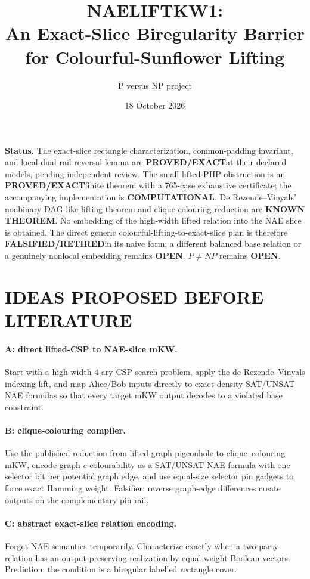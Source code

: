 \documentclass[11pt]{article}
\title{NAELIFTKW1:\\An Exact-Slice Biregularity Barrier for Colourful-Sunflower Lifting}
\author{P versus NP project}
\date{18 October 2026}
\newcommand{\EXACT}{\textbf{PROVED/EXACT}}
\newcommand{\KNOWN}{\textbf{KNOWN THEOREM}}
\newcommand{\COMP}{\textbf{COMPUTATIONAL}}
\newcommand{\OPEN}{\textbf{OPEN}}
\newcommand{\RET}{\textbf{FALSIFIED/RETIRED}}
\begin{document}
\maketitle

\noindent\textbf{Status.}
The exact-slice rectangle characterization, common-padding invariant, and local dual-rail reversal lemma are \EXACT at their declared models, pending independent review. The small lifted-PHP obstruction is an \EXACT finite theorem with a 765-case exhaustive certificate; the accompanying implementation is \COMP. De Rezende--Vinyals' nonbinary DAG-like lifting theorem and clique-colouring reduction are \KNOWN. No embedding of the high-width lifted relation into the NAE slice is obtained. The direct generic colourful-lifting-to-exact-slice plan is therefore \RET in its naive form; a different balanced base relation or a genuinely nonlocal embedding remains \OPEN. $P\ne NP$ remains \OPEN.

\section{IDEAS PROPOSED BEFORE LITERATURE}
\paragraph{A: direct lifted-CSP to NAE-slice mKW.}
Start with a high-width $4$-ary CSP search problem, apply the de Rezende--Vinyals indexing lift, and map Alice/Bob inputs directly to exact-density SAT/UNSAT NAE formulas so that every target mKW output decodes to a violated base constraint.

\paragraph{B: clique-colouring compiler.}
Use the published reduction from lifted graph pigeonhole to clique--colouring mKW, encode graph $c$-colourability as a SAT/UNSAT NAE formula with one selector bit per potential graph edge, and use equal-size selector pin gadgets to force exact Hamming weight. Falsifier: reverse graph-edge differences create outputs on the complementary pin rail.

\paragraph{C: abstract exact-slice relation encoding.}
Forget NAE semantics temporarily. Characterize exactly when a two-party relation has an output-preserving realization by equal-weight Boolean vectors. Prediction: the condition is a biregular labelled rectangle cover.
\end{document}
